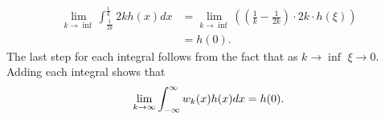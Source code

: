 \begin{example}
    \begin{equation*}
        \begin{split}
            \lim_{k\to \inf}\int_{\frac{1}{2k}}^{\frac{1}{k}} 2kh(x)dx &= \lim_{k\to \inf}  \left( \left(\frac{1}{k} - \frac{1}{2k}\right) \cdot 2k\cdot h(\xi)\right) \\
            &=h(0).
        \end{split}
    \end{equation*}
    The last step for each integral follows from the fact that as \(k \to \inf\) \(\xi\to 0\). Adding each integral shows that
    \begin{equation*}
        \lim_{k\to \infty}\int_{-\infty}^{\infty} w_k(x) h(x) dx = h(0).
    \end{equation*}
\end{example}